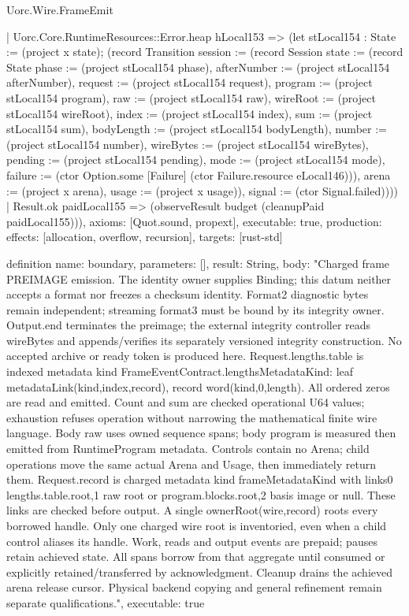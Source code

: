 \begin{lexlean}{Uorc.Wire.FrameEmit}
\begin{semanticmodule}
{      | Uorc.Core.RuntimeResources::Error.heap hLocal153 => (let stLocal154 : State := (project x state); (record Transition {session := (record Session {state := (record State {phase := (project stLocal154 phase), afterNumber := (project stLocal154 afterNumber), request := (project stLocal154 request), program := (project stLocal154 program), raw := (project stLocal154 raw), wireRoot := (project stLocal154 wireRoot), index := (project stLocal154 index), sum := (project stLocal154 sum), bodyLength := (project stLocal154 bodyLength), number := (project stLocal154 number), wireBytes := (project stLocal154 wireBytes), pending := (project stLocal154 pending), mode := (project stLocal154 mode), failure := (ctor Option.some [Failure] (ctor Failure.resource eLocal146))}), arena := (project x arena), usage := (project x usage)}), signal := (ctor Signal.failed)})))
    | Result.ok paidLocal155 => (observeResult budget (cleanupPaid paidLocal155))),
  axioms: [Quot.sound, propext],
  executable: true,
  production: {effects: [allocation, overflow, recursion], targets: [rust-std]}
}

definition{
  name: boundary,
  parameters: [],
  result: String,
  body: "Charged frame PREIMAGE emission. The identity owner supplies Binding; this datum neither accepts a format nor freezes a checksum identity. Format2 diagnostic bytes remain independent; streaming format3 must be bound by its integrity owner. Output.end terminates the preimage; the external integrity controller reads wireBytes and appends/verifies its separately versioned integrity construction. No accepted archive or ready token is produced here. Request.lengths.table is indexed metadata kind FrameEventContract.lengthsMetadataKind: leaf metadataLink(kind,index,record), record word(kind,0,length). All ordered zeros are read and emitted. Count and sum are checked operational U64 values; exhaustion refuses operation without narrowing the mathematical finite wire language. Body raw uses owned sequence spans; body program is measured then emitted from RuntimeProgram metadata. Controls contain no Arena; child operations move the same actual Arena and Usage, then immediately return them. Request.record is charged metadata kind frameMetadataKind with links0 lengths.table.root,1 raw root or program.blocks.root,2 basis image or null. These links are checked before output. A single ownerRoot(wire,record) roots every borrowed handle. Only one charged wire root is inventoried, even when a child control aliases its handle. Work, reads and output events are prepaid; pauses retain achieved state. All spans borrow from that aggregate until consumed or explicitly retained/transferred by acknowledgment. Cleanup drains the achieved arena release cursor. Physical backend copying and general refinement remain separate qualifications.",
  executable: true
}
\end{semanticmodule}
\end{lexlean}

